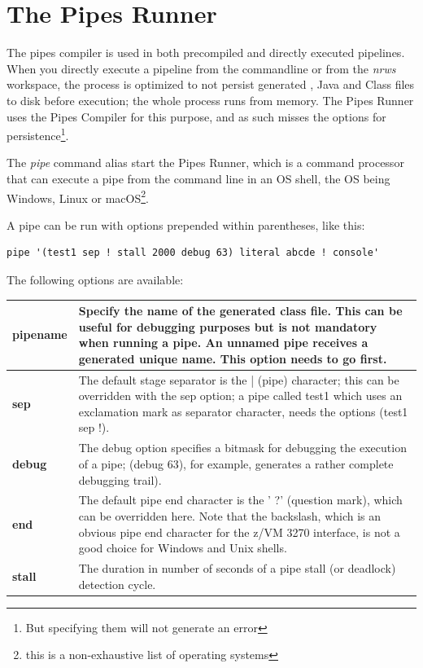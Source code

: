 \chapter{The Pipes Runner}
The pipes compiler is used in both precompiled and directly executed
pipelines. When you directly execute a pipeline from the commandline
or from the \emph{nrws} \nr{} workspace, the process is optimized to not persist
generated \nr{}, Java and Class files to disk before execution; the
whole process runs from memory. The Pipes Runner uses the Pipes
Compiler for this purpose, and as such misses the options for
persistence\footnote{But specifying them will not generate an error}.

The \emph{pipe} command alias start the Pipes Runner, which is a
command processor that can execute a pipe from the command line in an
OS shell, the OS being Windows, Linux or macOS\footnote{this is a
  non-exhaustive list of operating systems}.

A pipe can be run with options prepended within parentheses, like this:
\begin{lstlisting}
pipe '(test1 sep ! stall 2000 debug 63) literal abcde ! console'
\end{lstlisting}

The following options are
available:

\begin{tabularx}{\textwidth}{>{\bfseries}lX}
\toprule
pipename&Specify the name of the generated class file. This
can be useful for debugging purposes but is not mandatory when running
a pipe. An unnamed pipe receives a generated unique name. This option
needs to go first.
\\\midrule
sep&The default stage separator is the |
(pipe) character; this can be overridden with the sep option; a pipe
called test1 which uses an exclamation mark as separator character,
needs the options (test1 sep !).
\\\midrule
debug&The debug option specifies a bitmask for
debugging the execution of a pipe; (debug 63), for
example, generates a rather complete debugging trail).
\\\midrule
end&The default pipe end character is the ' ?'
  (question mark), which can be overridden here. Note that the
  backslash, which is an obvious pipe end character for the z/VM 3270
  interface, is not a good choice for Windows and Unix shells.
  \\\midrule
stall& The duration in number of seconds of a pipe stall (or deadlock)
detection cycle.
\\\bottomrule
\end{tabularx}


